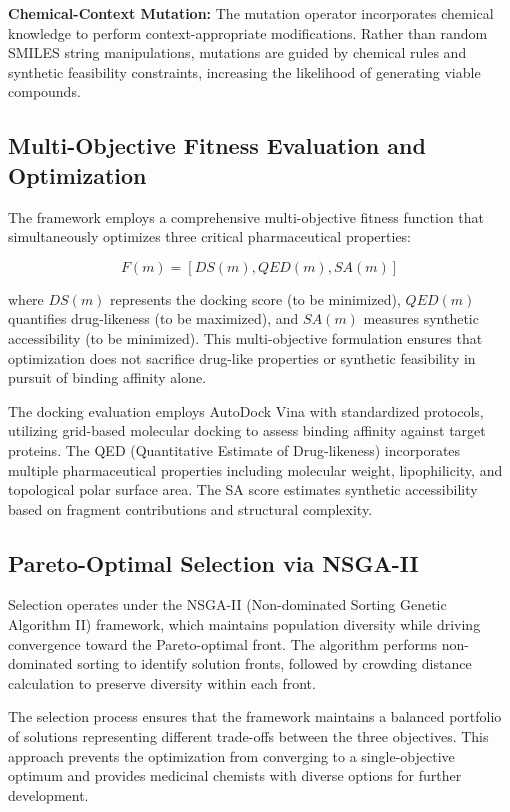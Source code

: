 \documentclass[lettersize,journal]{IEEEtran}
\begin{document}
\noindent \textbf{Chemical-Context Mutation:} The mutation operator incorporates chemical knowledge to perform context-appropriate modifications. Rather than random SMILES string manipulations, mutations are guided by chemical rules and synthetic feasibility constraints, increasing the likelihood of generating viable compounds.

\subsection{Multi-Objective Fitness Evaluation and Optimization}

The framework employs a comprehensive multi-objective fitness function that simultaneously optimizes three critical pharmaceutical properties:

\begin{equation}
F(m) = [DS(m), QED(m), SA(m)]
\end{equation}

where $DS(m)$ represents the docking score (to be minimized), $QED(m)$ quantifies drug-likeness (to be maximized), and $SA(m)$ measures synthetic accessibility (to be minimized). This multi-objective formulation ensures that optimization does not sacrifice drug-like properties or synthetic feasibility in pursuit of binding affinity alone.

The docking evaluation employs AutoDock Vina with standardized protocols, utilizing grid-based molecular docking to assess binding affinity against target proteins. The QED (Quantitative Estimate of Drug-likeness) incorporates multiple pharmaceutical properties including molecular weight, lipophilicity, and topological polar surface area. The SA score estimates synthetic accessibility based on fragment contributions and structural complexity.

\subsection{Pareto-Optimal Selection via NSGA-II}

Selection operates under the NSGA-II (Non-dominated Sorting Genetic Algorithm II) framework, which maintains population diversity while driving convergence toward the Pareto-optimal front. The algorithm performs non-dominated sorting to identify solution fronts, followed by crowding distance calculation to preserve diversity within each front.

The selection process ensures that the framework maintains a balanced portfolio of solutions representing different trade-offs between the three objectives. This approach prevents the optimization from converging to a single-objective optimum and provides medicinal chemists with diverse options for further development.
\end{document}
